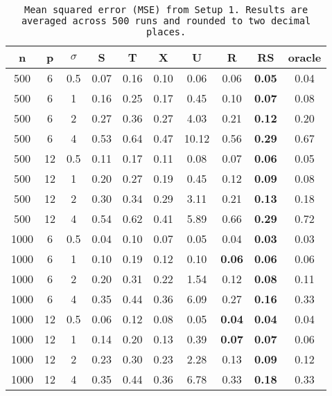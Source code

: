 \begin{table}[ht]
\centering
\begin{tabular}{cccccccccc}
  \hline
n & p & $\sigma$ & S & T & X & U & R & RS & oracle \\ 
  \hline
500 & 6 & 0.5 & 0.07 & 0.16 & 0.10 &  0.06 & 0.06 & \bf 0.05 & 0.04 \\ 
  500 & 6 & 1 & 0.16 & 0.25 & 0.17 &  0.45 & 0.10 & \bf 0.07 & 0.08 \\ 
  500 & 6 & 2 & 0.27 & 0.36 & 0.27 &  4.03 & 0.21 & \bf 0.12 & 0.20 \\ 
  500 & 6 & 4 & 0.53 & 0.64 & 0.47 & 10.12 & 0.56 & \bf 0.29 & 0.67 \\ 
  500 & 12 & 0.5 & 0.11 & 0.17 & 0.11 &  0.08 & 0.07 & \bf 0.06 & 0.05 \\ 
  500 & 12 & 1 & 0.20 & 0.27 & 0.19 &  0.45 & 0.12 & \bf 0.09 & 0.08 \\ 
  500 & 12 & 2 & 0.30 & 0.34 & 0.29 &  3.11 & 0.21 & \bf 0.13 & 0.18 \\ 
  500 & 12 & 4 & 0.54 & 0.62 & 0.41 &  5.89 & 0.66 & \bf 0.29 & 0.72 \\ 
  1000 & 6 & 0.5 & 0.04 & 0.10 & 0.07 &  0.05 & 0.04 & \bf 0.03 & 0.03 \\ 
  1000 & 6 & 1 & 0.10 & 0.19 & 0.12 &  0.10 & \bf 0.06 & \bf 0.06 & 0.06 \\ 
  1000 & 6 & 2 & 0.20 & 0.31 & 0.22 &  1.54 & 0.12 & \bf 0.08 & 0.11 \\ 
  1000 & 6 & 4 & 0.35 & 0.44 & 0.36 &  6.09 & 0.27 & \bf 0.16 & 0.33 \\ 
  1000 & 12 & 0.5 & 0.06 & 0.12 & 0.08 &  0.05 & \bf 0.04 & \bf 0.04 & 0.04 \\ 
  1000 & 12 & 1 & 0.14 & 0.20 & 0.13 &  0.39 & \bf 0.07 & \bf 0.07 & 0.06 \\ 
  1000 & 12 & 2 & 0.23 & 0.30 & 0.23 &  2.28 & 0.13 & \bf 0.09 & 0.12 \\ 
  1000 & 12 & 4 & 0.35 & 0.44 & 0.36 &  6.78 & 0.33 & \bf 0.18 & 0.33 \\ 
   \hline
\end{tabular}
\caption{\tt Mean squared error (MSE) from Setup 1. Results are averaged across 500 runs and rounded to two decimal places.} 
\label{table:setup1}
\end{table}

